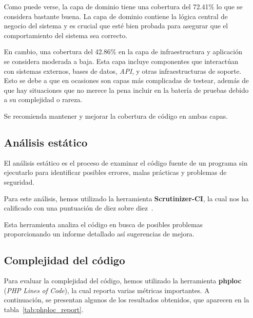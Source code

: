 Como puede verse, la capa de dominio tiene una cobertura del 72.41\% lo que se considera bastante buena.
La capa de dominio contiene la lógica central de negocio del sistema y es crucial que esté bien probada para asegurar
que el comportamiento del sistema sea correcto.

En cambio, una cobertura del 42.86\% en la capa de infraestructura y aplicación se considera moderada a baja.
Esta capa incluye componentes que interactúan con sistemas externos, bases de datos, \textit{API}, y otras
infraestructuras de soporte.
Esto se debe a que en ocasiones son capas más complicadas de testear, además de que hay situaciones que no merece la
pena incluir en la batería de pruebas debido a su complejidad o rareza.

Se recomienda mantener y mejorar la cobertura de código en ambas capas.

\subsection{Análisis estático}

El análisis estático es el proceso de examinar el código fuente de un programa sin ejecutarlo para identificar posibles
errores, malas prácticas y problemas de seguridad.

Para este análisis, hemos utilizado la herramienta \textbf{Scrutinizer-CI}, la cual nos ha calificado con una puntuación
de diez sobre diez~\cite{url_scrutinizer_viu_84_proyecto}.

Esta herramienta analiza el código en busca de posibles problemas proporcionando un informe detallado así
sugerencias de mejora.

\subsection{Complejidad del código}

Para evaluar la complejidad del código, hemos utilizado la herramienta \textbf{phploc} (\textit{PHP Lines of Code}), la
cual reporta varias métricas importantes.
A continuación, se presentan algunos de los resultados obtenidos, que aparecen en la tabla~\ref{tab:phploc_report}.

